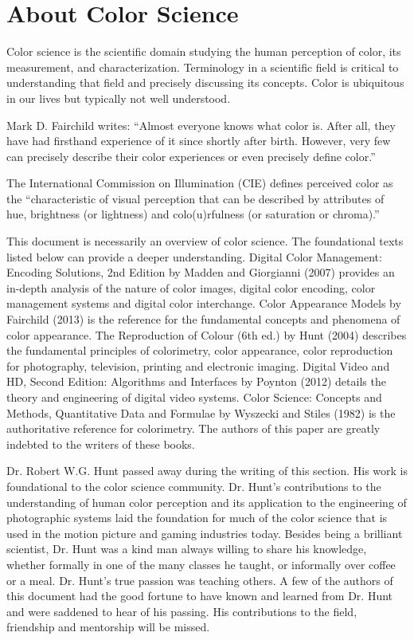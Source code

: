 \section{About Color Science}
\label{sec:about-color-science}

Color science is the scientific domain studying the human perception of color, its measurement, and characterization. Terminology in a scientific field is critical to understanding that field and precisely discussing its concepts. Color is ubiquitous in our lives but typically not well understood.

Mark D. Fairchild writes:
“Almost everyone knows what color is. After all, they have had firsthand experience of it since shortly after birth. However, very few can precisely describe their color experiences or even precisely define color.”

The International Commission on Illumination (CIE) defines perceived color as the “characteristic of visual perception that can be described by attributes of hue, brightness (or lightness) and colo(u)rfulness (or saturation or chroma).”

This document is necessarily an overview of color science. The foundational texts listed below can provide a deeper understanding.
Digital Color Management: Encoding Solutions, 2nd Edition by Madden and Giorgianni (2007) provides an in-depth analysis of the nature of color images, digital color encoding, color management systems and digital color interchange.
Color Appearance Models by Fairchild (2013) is the reference for the fundamental concepts and phenomena of color appearance.
The Reproduction of Colour (6th ed.) by Hunt (2004) describes the fundamental principles of colorimetry, color appearance, color reproduction for photography, television, printing and electronic imaging.
Digital Video and HD, Second Edition: Algorithms and Interfaces by Poynton (2012) details the theory and engineering of digital video systems.
Color Science: Concepts and Methods, Quantitative Data and Formulae by Wyszecki and Stiles (1982) is the authoritative reference for colorimetry.
The authors of this paper are greatly indebted to the writers of these books.

Dr. Robert W.G. Hunt passed away during the writing of this section. His work is foundational to the color science community. Dr. Hunt’s contributions to the understanding of human color perception and its application to the engineering of photographic systems laid the foundation for much of the color science that is used in the motion picture and gaming industries today. Besides being a brilliant scientist, Dr. Hunt was a kind man always willing to share his knowledge, whether formally in one of the many classes he taught, or informally over coffee or a meal. Dr. Hunt’s true passion was teaching others. A few of the authors of this document had the good fortune to have known and learned from Dr. Hunt and were saddened to hear of his passing. His contributions to the field, friendship and mentorship will be missed.

